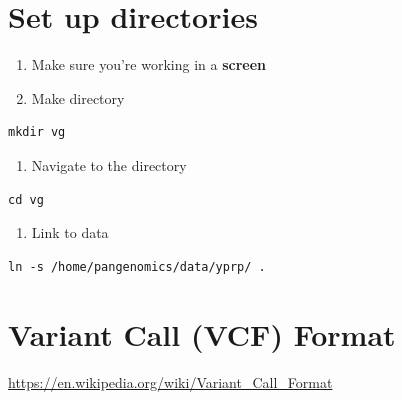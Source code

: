 \documentclass[
]{book}
\providecommand{\tightlist}{%
  \setlength{\itemsep}{0pt}\setlength{\parskip}{0pt}}
\begin{document}
\hypertarget{set-up-directories-1}{%
\section{Set up directories}\label{set-up-directories-1}}

\begin{enumerate}
\def\labelenumi{\arabic{enumi}.}
\tightlist
\item
  Make sure you're working in a \textbf{screen}
\item
  Make directory
\end{enumerate}

\begin{verbatim}
mkdir vg
\end{verbatim}

\begin{enumerate}
\def\labelenumi{\arabic{enumi}.}
\setcounter{enumi}{2}
\tightlist
\item
  Navigate to the directory
\end{enumerate}

\begin{verbatim}
cd vg
\end{verbatim}

\begin{enumerate}
\def\labelenumi{\arabic{enumi}.}
\setcounter{enumi}{3}
\tightlist
\item
  Link to data
\end{enumerate}

\begin{verbatim}
ln -s /home/pangenomics/data/yprp/ .
\end{verbatim}

\hypertarget{variant-call-vcf-format}{%
\section{Variant Call (VCF) Format}\label{variant-call-vcf-format}}

\url{https://en.wikipedia.org/wiki/Variant_Call_Format}
\end{document}
